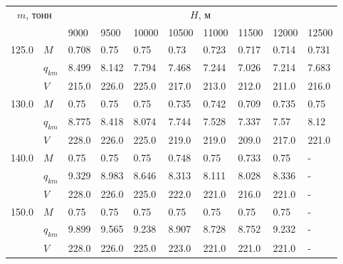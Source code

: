 \begin{tabular}{|l|l|llllllll|}\hline
\multicolumn{2}{|c|}{$m$, тонн}& \multicolumn{8}{c|}{$H$, м}\\ 
 \cline{3-10}
 \multicolumn{2}{|c|}{}&    9000 &    9500 &   10000 &                    10500 &                    11000 &                   11500 &   12000 &  12500 \\
\hline
125.0 & $M$ &   0.708 &    0.75 &    0.75 &                     0.73 &                    0.723 &  0.717\cellcolor{green} &   0.714 &  0.731 \\
      & $q_{km}$ &   8.499 &   8.142 &   7.794 &                    7.468 &                    7.244 &  7.026\cellcolor{green} &   7.214 &  7.683 \\
      & $V$ &   215.0 &   226.0 &   225.0 &                    217.0 &                    213.0 &  212.0\cellcolor{green} &   211.0 &  216.0 \\
\hline
130.0 & $M$ &    0.75 &    0.75 &    0.75 &                    0.735 &                    0.742 &  0.709\cellcolor{green} &   0.735 &   0.75 \\
      & $q_{km}$ &   8.775 &   8.418 &   8.074 &                    7.744 &                    7.528 &  7.337\cellcolor{green} &    7.57 &   8.12 \\
      & $V$ &   228.0 &   226.0 &   225.0 &                    219.0 &                    219.0 &  209.0\cellcolor{green} &   217.0 &  221.0 \\
\hline
140.0 & $M$ &    0.75 &    0.75 &    0.75 &                    0.748 &                     0.75 &  0.733\cellcolor{green} &    0.75 &      - \\
      & $q_{km}$ &   9.329 &   8.983 &   8.646 &                    8.313 &                    8.111 &  8.028\cellcolor{green} &   8.336 &      - \\
      & $V$ &   228.0 &   226.0 &   225.0 &                    222.0 &                    221.0 &  216.0\cellcolor{green} &   221.0 &      - \\
\hline
150.0 & $M$ &    0.75 &    0.75 &    0.75 &                     0.75 &    0.75\cellcolor{green} &                    0.75 &    0.75 &      - \\
      & $q_{km}$ &   9.899 &   9.565 &   9.238 &                    8.907 &   8.728\cellcolor{green} &                   8.752 &   9.232 &      - \\
      & $V$ &   228.0 &   226.0 &   225.0 &                    223.0 &   221.0\cellcolor{green} &                   221.0 &   221.0 &      - \\

\end{tabular}
